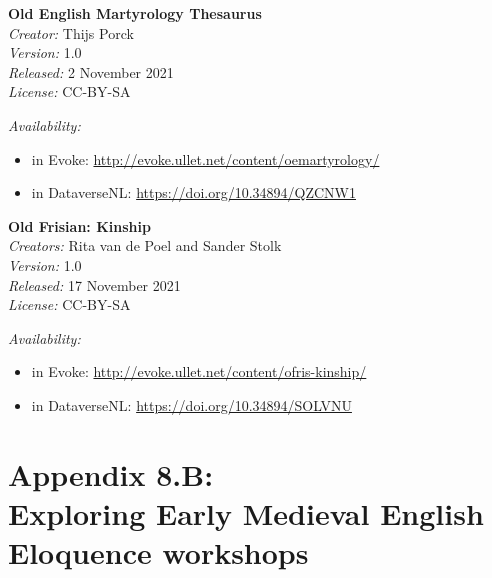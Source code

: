 \noindent
\textbf{Old English Martyrology Thesaurus} \\
\textit{Creator:} Thijs Porck \\
\textit{Version:} 1.0 \\
\textit{Released:} 2 November 2021 \\
\textit{License:} CC-BY-SA \\
{\textit{Availability:} 
\vspace{-\topsep}
\begin{itemize}
\setlength{\itemsep}{0pt}
\setlength{\parskip}{0pt}
\setlength{\parsep}{0pt}
\item in Evoke: \url{http://evoke.ullet.net/content/oemartyrology/}
\item in DataverseNL: \url{https://doi.org/10.34894/QZCNW1}
\end{itemize}}
\vspace{\baselineskip}

\noindent
\textbf{Old Frisian: Kinship} \\
\textit{Creators:} Rita van de Poel and Sander Stolk \\
\textit{Version:} 1.0 \\
\textit{Released:} 17 November 2021 \\
\textit{License:} CC-BY-SA \\
{\textit{Availability:} 
\vspace{-\topsep}
\begin{itemize}
\setlength{\itemsep}{0pt}
\setlength{\parskip}{0pt}
\setlength{\parsep}{0pt}
\item in Evoke: \url{http://evoke.ullet.net/content/ofris-kinship/}
\item in DataverseNL: \url{https://doi.org/10.34894/SOLVNU}
\end{itemize}}
\vspace{\baselineskip}


\newpage
\section*{Appendix 8.B:\\Exploring Early Medieval English Eloquence workshops}
\label{Appendix8.B}

\begingroup
\renewcommand{\thefigure}{8.B.\arabic{figure}}
\setcounter{figure}{0}
\renewcommand{\thetable}{8.B.\arabic{table}}
\setcounter{table}{0}


